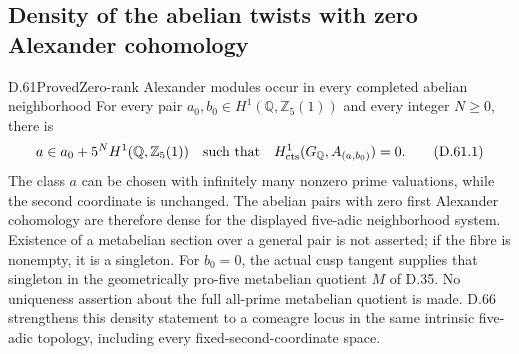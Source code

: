 \subsection{Density of the abelian twists with zero Alexander cohomology}

\begin{statement}{D.61}{Proved}{Zero-rank Alexander modules occur in every completed abelian neighborhood}
For every pair \(a_0,b_0\in H^1(\mathbb Q,\mathbb Z_5(1))\)
and every integer \(N\ge0\), there is
\[
 a\in a_0+5^N H^1(\mathbb Q,\mathbb Z_5(1))
 \quad\hbox{such that}\quad
 H^1_{\mathrm{cts}}(G_{\mathbb Q},A_{(a,b_0)})=0.
                                                        \tag{D.61.1}
\]
The class \(a\) can be chosen with infinitely many nonzero
prime valuations, while the second coordinate is unchanged.
The abelian pairs with zero first Alexander cohomology are
therefore dense for the displayed five-adic neighborhood
system. Existence of a metabelian section over a general
pair is not asserted; if the fibre is nonempty, it is a singleton.
For \(b_0=0\), the actual cusp tangent supplies that singleton
in the geometrically pro-five metabelian quotient \(M\) of
D.35. No uniqueness assertion about the full all-prime
metabelian quotient is made.
D.66 strengthens this density statement to a comeagre
locus in the same intrinsic five-adic topology, including
every fixed-second-coordinate space.
\end{statement}


